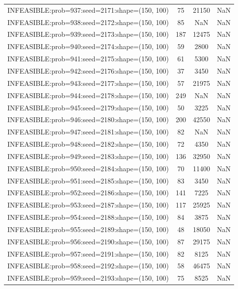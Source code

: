 \begin{longtable}{lccc}
INFEASIBLE:prob=937:seed=2171:shape=(150, 100) &    75 & 21150 &    NaN \\
INFEASIBLE:prob=938:seed=2172:shape=(150, 100) &    85 &   NaN &    NaN \\
INFEASIBLE:prob=939:seed=2173:shape=(150, 100) &   187 & 12475 &    NaN \\
INFEASIBLE:prob=940:seed=2174:shape=(150, 100) &    59 &  2800 &    NaN \\
INFEASIBLE:prob=941:seed=2175:shape=(150, 100) &    61 &  5300 &    NaN \\
INFEASIBLE:prob=942:seed=2176:shape=(150, 100) &    37 &  3450 &    NaN \\
INFEASIBLE:prob=943:seed=2177:shape=(150, 100) &    57 & 21975 &    NaN \\
INFEASIBLE:prob=944:seed=2178:shape=(150, 100) &   249 &   NaN &    NaN \\
INFEASIBLE:prob=945:seed=2179:shape=(150, 100) &    50 &  3225 &    NaN \\
INFEASIBLE:prob=946:seed=2180:shape=(150, 100) &   200 & 42550 &    NaN \\
INFEASIBLE:prob=947:seed=2181:shape=(150, 100) &    82 &   NaN &    NaN \\
INFEASIBLE:prob=948:seed=2182:shape=(150, 100) &    72 &  4350 &    NaN \\
INFEASIBLE:prob=949:seed=2183:shape=(150, 100) &   136 & 32950 &    NaN \\
INFEASIBLE:prob=950:seed=2184:shape=(150, 100) &    70 & 11400 &    NaN \\
INFEASIBLE:prob=951:seed=2185:shape=(150, 100) &    83 &  3450 &    NaN \\
INFEASIBLE:prob=952:seed=2186:shape=(150, 100) &   141 &  7225 &    NaN \\
INFEASIBLE:prob=953:seed=2187:shape=(150, 100) &   117 & 25925 &    NaN \\
INFEASIBLE:prob=954:seed=2188:shape=(150, 100) &    84 &  3875 &    NaN \\
INFEASIBLE:prob=955:seed=2189:shape=(150, 100) &    48 & 18050 &    NaN \\
INFEASIBLE:prob=956:seed=2190:shape=(150, 100) &    87 & 29175 &    NaN \\
INFEASIBLE:prob=957:seed=2191:shape=(150, 100) &    82 &  8125 &    NaN \\
INFEASIBLE:prob=958:seed=2192:shape=(150, 100) &    58 & 46475 &    NaN \\
INFEASIBLE:prob=959:seed=2193:shape=(150, 100) &    75 &  8525 &    NaN \\

\end{longtable}
